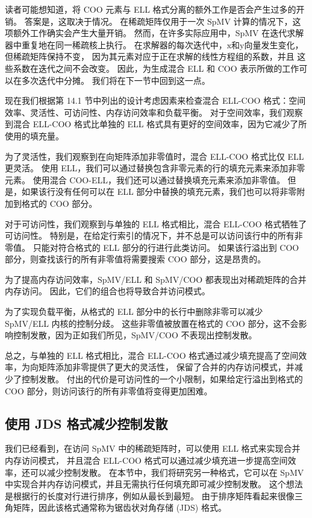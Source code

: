 读者可能想知道，将 COO 元素与 ELL 格式分离的额外工作是否会产生过多的开销。 答案是，这取决于情况。 
在稀疏矩阵仅用于一次 SpMV 计算的情况下，这项额外工作确实会产生大量开销。 
然而，在许多实际应用中，SpMV 在迭代求解器中重复地在同一稀疏核上执行。 
在求解器的每次迭代中，$\mathrm{x}$和$\mathrm{y}$向量发生变化，但稀疏矩阵保持不变，
因为其元素对应于正在求解的线性方程组的系数，并且 这些系数在迭代之间不会改变。 
因此，为生成混合 ELL 和 COO 表示所做的工作可以在多次迭代中分摊。 我们将在下一节中回到这一点。

现在我们根据第 14.1 节中列出的设计考虑因素来检查混合 ELL-COO 格式：空间效率、灵活性、可访问性、内存访问效率和负载平衡。 
对于空间效率，我们观察到混合 ELL-COO 格式比单独的 ELL 格式具有更好的空间效率，因为它减少了所使用的填充量。

为了灵活性，我们观察到在向矩阵添加非零值时，混合 ELL-COO 格式比仅 ELL 更灵活。 
使用 ELL，我们可以通过替换包含非零元素的行的填充元素来添加非零元素。 
使用混合 COO-ELL，我们还可以通过替换填充元素来添加非零值。 
但是，如果该行没有任何可以在 ELL 部分中替换的填充元素，我们也可以将非零附加到格式的 COO 部分。

对于可访问性，我们观察到与单独的 ELL 格式相比，混合 ELL-COO 格式牺牲了可访问性。 
特别是，在给定行索引的情况下，并不总是可以访问该行中的所有非零值。 只能对符合格式的 ELL 部分的行进行此类访问。 
如果该行溢出到 $\mathrm{COO}$ 部分，则查找该行的所有非零值将需要搜索 $\mathrm{COO}$ 部分，这是昂贵的。

为了提高内存访问效率，SpMV/ELL 和 SpMV/COO 都表现出对稀疏矩阵的合并内存访问。 
因此，它们的组合也将导致合并访问模式。

为了实现负载平衡，从格式的 ELL 部分中的长行中删除非零可以减少 SpMV/ELL 内核的控制分歧。 
这些非零值被放置在格式的 $\mathrm{COO}$ 部分，这不会影响控制发散，因为正如我们所见，SpMV/COO 不表现出控制发散。

总之，与单独的 ELL 格式相比，混合 ELL-COO 格式通过减少填充提高了空间效率，为向矩阵添加非零提供了更大的灵活性，
保留了合并的内存访问模式，并减少了控制发散。 
付出的代价是可访问性的一个小限制，如果给定行溢出到格式的 $\mathrm{COO}$ 部分，则访问该行的所有非零值将变得更加困难。

\subsection{使用 JDS 格式减少控制发散}
我们已经看到，在访问 SpMV 中的稀疏矩阵时，可以使用 ELL 格式来实现合并内存访问模式，
并且混合 ELL-COO 格式可以通过减少填充进一步提高空间效率，还可以减少控制发散。 
在本节中，我们将研究另一种格式，它可以在 SpMV 中实现合并内存访问模式，并且无需执行任何填充即可减少控制发散。 
这个想法是根据行的长度对行进行排序，例如从最长到最短。 
由于排序矩阵看起来很像三角矩阵，因此该格式通常称为锯齿状对角存储 (JDS) 格式。

